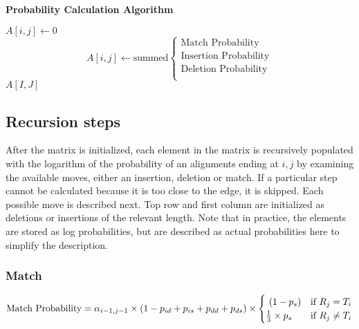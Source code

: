 \documentclass[fleqn,10pt]{SelfArx} %
\begin{document}
\begin{algorithm}
\caption*{\textbf{Probability Calculation Algorithm}}
\label{calcScore}
\begin{algorithmic}[h]
\STATE $A[i,j] \leftarrow 0$
\ELSE
\STATE \[
	A[i,j]  \leftarrow \text{summed}
\begin{cases}
	\text{Match Probability} \\
	\text{Insertion Probability} \\
	\text{Deletion Probability} \\
   	\end{cases}
\]
\ENDIF	
\ENDFOR
\ENDFOR
\RETURN $A[I,J]$
\end{algorithmic}
\end{algorithm}





\subsection{Recursion steps}
After the matrix is initialized, each element in the matrix is recursively populated with the logarithm of the probability of an alignments ending at $i,j$ by examining the available moves, either an insertion, deletion or match.  If a particular step cannot be calculated because it is too close to the edge, it is skipped.  Each possible move is described next.  Top row and first column are initialized as deletions or insertions of the relevant length.  Note that in practice, the elements are stored as log probabilities, but are described as actual probabilities here to simplify the description.






\subsubsection{\textbf{Match}}


\begin{dmath}
\text{Match Probability} = \\
	 \alpha_{i-1,j-1}  \times  (1-p_{id}+p_{is}+p_{dd}+p_{ds})  \times 
	 \begin{cases}
							 \ (1-p_{s}) & \text{if }  R_{j} = T_{i} \\
							 \frac{1}{3} \times p_{s}  & \text{if }  R_{j}  \neq T_{i} 
							 \end{cases}
\end{dmath}
\end{document}

